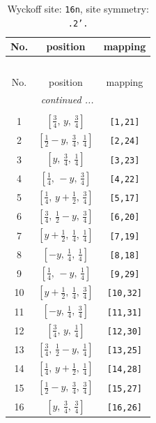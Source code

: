 \documentclass[fleqn,8pt]{jsarticle}
\begin{document}
\begin{longtable}{ccc}
\caption{Wyckoff site: {\tt 16n}, site symmetry: {\tt .2'.}}
 \\
 \hline \hline
No. & position & mapping \\ \hline \endfirsthead

\multicolumn{2}{l}{\tablename\ \thetable{}} \\
 \hline \hline
No. & position & mapping \\ \hline \endhead

 \hline \hline
\multicolumn{2}{r}{\footnotesize\it continued ...} \\ \endfoot

 \hline \hline
\multicolumn{2}{r}{} \\ \endlastfoot

1 & $\left[ \frac{3}{4},\, y,\, \frac{3}{4} \right]$ & {\tt [1,21]} \\ \hline
2 & $\left[ \frac{1}{2} - y,\, \frac{3}{4},\, \frac{1}{4} \right]$ & {\tt [2,24]} \\ \hline
3 & $\left[ y,\, \frac{3}{4},\, \frac{1}{4} \right]$ & {\tt [3,23]} \\ \hline
4 & $\left[ \frac{1}{4},\, - y,\, \frac{3}{4} \right]$ & {\tt [4,22]} \\ \hline
5 & $\left[ \frac{1}{4},\, y + \frac{1}{2},\, \frac{3}{4} \right]$ & {\tt [5,17]} \\ \hline
6 & $\left[ \frac{3}{4},\, \frac{1}{2} - y,\, \frac{3}{4} \right]$ & {\tt [6,20]} \\ \hline
7 & $\left[ y + \frac{1}{2},\, \frac{1}{4},\, \frac{1}{4} \right]$ & {\tt [7,19]} \\ \hline
8 & $\left[ - y,\, \frac{1}{4},\, \frac{1}{4} \right]$ & {\tt [8,18]} \\ \hline
9 & $\left[ \frac{1}{4},\, - y,\, \frac{1}{4} \right]$ & {\tt [9,29]} \\ \hline
10 & $\left[ y + \frac{1}{2},\, \frac{1}{4},\, \frac{3}{4} \right]$ & {\tt [10,32]} \\ \hline
11 & $\left[ - y,\, \frac{1}{4},\, \frac{3}{4} \right]$ & {\tt [11,31]} \\ \hline
12 & $\left[ \frac{3}{4},\, y,\, \frac{1}{4} \right]$ & {\tt [12,30]} \\ \hline
13 & $\left[ \frac{3}{4},\, \frac{1}{2} - y,\, \frac{1}{4} \right]$ & {\tt [13,25]} \\ \hline
14 & $\left[ \frac{1}{4},\, y + \frac{1}{2},\, \frac{1}{4} \right]$ & {\tt [14,28]} \\ \hline
15 & $\left[ \frac{1}{2} - y,\, \frac{3}{4},\, \frac{3}{4} \right]$ & {\tt [15,27]} \\ \hline
16 & $\left[ y,\, \frac{3}{4},\, \frac{3}{4} \right]$ & {\tt [16,26]} \\
\end{longtable}
\end{document}
